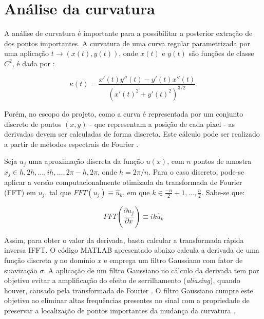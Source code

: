 \section{Análise da curvatura}\label{sec:curvdisc}

A análise de curvatura é importante para a possibilitar a posterior extração de dos pontos importantes. A curvatura de uma curva regular parametrizada por uma aplicação $t \rightarrow (x(t), y(t))$, onde $x(t)$ e $y(t)$ são funções de classe $C^2$, é dada por \cite{OliveiraMarroquim2020}:

\begin{equation}
    \kappa (t) = \frac{x'(t) y''(t) - y'(t) x''(t)}{(x'(t)^2 + y'(t)^2)^{3/2}}.
\end{equation}

Porém, no escopo do projeto, como a curva é representada por um conjunto discreto de pontos $(x, y)$ - que representam a posição de cada pixel - as derivadas devem ser calculadas de forma discreta. Este cálculo pode ser realizado a partir de métodos espectrais de Fourier \cite{brethwashington}.

Seja $u_j$ uma aproximação discreta da função $u(x)$, com $n$ pontos de amostra $x_j \in h, 2h, \dots, ih, \dots, 2\pi - h, 2\pi$, onde $h = 2\pi/n$. Para o caso discreto, pode-se aplicar a versão computacionalmente otimizada da transformada de Fourier (FFT) em $u_j$, tal que $FFT(u_j) \equiv \hat{u}_k$, em que $k \in \frac{-n}{2}+1, \dots, \frac{n}{2}$. Sabe-se que:

$$FFT \left (\frac{\partial u_j}{\partial x} \right) \equiv i k \hat{u}_k$$

Assim, para obter o valor da derivada, basta calcular a transformada rápida inversa IFFT. O código MATLAB apresentado abaixo calcula a derivada de uma função discreta $y$ no domínio $x$ e emprega um filtro Gaussiano com fator de suavização $\sigma$. A aplicação de um filtro Gaussiano no cálculo da derivada tem por objetivo evitar a amplificação do efeito de serrilhamento (\textit{aliasing}), quando houver, causado pela transformada de Fourier \cite{li1987}. O filtro Gaussiano cumpre este objetivo ao eliminar altas frequências presentes no sinal com a propriedade de preservar a localização de pontos importantes da mudança da curvatura \cite{tomasi2007}.

